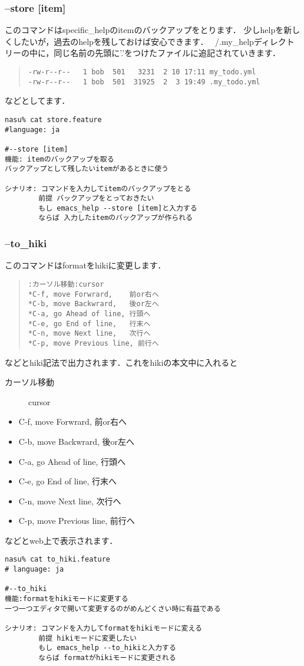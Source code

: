 \subsubsection{--store [item]}
このコマンドはspecific\_helpのitemのバックアップをとります．
少しhelpを新しくしたいが，過去のhelpを残しておけば安心できます．
~/.my\_helpディレクトリーの中に，同じ名前の先頭に'.'をつけたファイルに追記されていきます．
\begin{quote}\begin{verbatim}
-rw-r--r--   1 bob  501   3231  2 10 17:11 my_todo.yml
-rw-r--r--   1 bob  501  31925  2  3 19:49 .my_todo.yml
\end{verbatim}\end{quote}
などとしてます．
\begin{lstlisting}[style=customRuby]
nasu% cat store.feature
#language: ja

#--store [item]
機能: itemのバックアップを取る
バックアップとして残したいitemがあるときに使う

シナリオ: コマンドを入力してitemのバックアップをとる
        前提 バックアップをとっておきたい
        もし emacs_help --store [item]と入力する
        ならば 入力したitemのバックアップが作られる
\end{lstlisting}
\subsubsection{--to\_hiki}
このコマンドはformatをhikiに変更します．
\begin{quote}\begin{verbatim}
:カーソル移動:cursor
*C-f, move Forwrard,    前or右へ
*C-b, move Backwrard,   後or左へ
*C-a, go Ahead of line, 行頭へ
*C-e, go End of line,   行末へ
*C-n, move Next line,   次行へ
*C-p, move Previous line, 前行へ
\end{verbatim}\end{quote}
などとhiki記法で出力されます．これをhikiの本文中に入れると
\begin{description}
\item[カーソル移動] cursor

\end{description}
\begin{itemize}
\item C-f, move Forwrard,    前or右へ
\item C-b, move Backwrard,   後or左へ
\item C-a, go Ahead of line, 行頭へ
\item C-e, go End of line,   行末へ
\item C-n, move Next line,   次行へ
\item C-p, move Previous line, 前行へ
\end{itemize}
などとweb上で表示されます．
\begin{lstlisting}[style=customRuby]
nasu% cat to_hiki.feature
# language: ja

#--to_hiki
機能:formatをhikiモードに変更する
一つ一つエディタで開いて変更するのがめんどくさい時に有益である

シナリオ: コマンドを入力してformatをhikiモードに変える
        前提 hikiモードに変更したい
        もし emacs_help --to_hikiと入力する
        ならば formatがhikiモードに変更される
\end{lstlisting}
